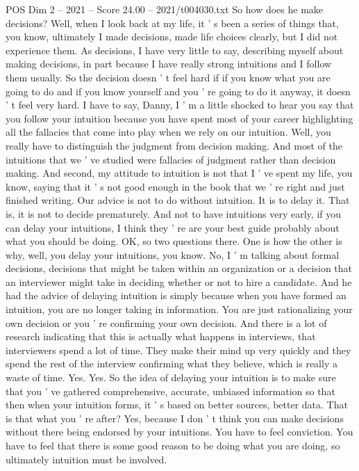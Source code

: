 \begin{textsample}{POS Dim 2 – 2021 – Score 24.00 – 2021/t004030.txt}
So how does he make decisions?
Well, when I look back at my life, it ' s been a series of things that, you know, ultimately I made decisions, made life choices clearly, but I did not experience them.
As decisions, I have very little to say, describing myself about making decisions, in part because I have really strong intuitions and I follow them usually.
So the decision doesn ' t feel hard if if you know what you are going to do and if you know yourself and you ' re going to do it anyway, it doesn ' t feel very hard.
I have to say, Danny, I ' m a little shocked to hear you say that you follow your intuition because you have spent most of your career highlighting all the fallacies that come into play when we rely on our intuition.
Well, you really have to distinguish the judgment from decision making.
And most of the intuitions that we ' ve studied were fallacies of judgment rather than decision making.
And second, my attitude to intuition is not that I ' ve spent my life, you know, saying that it ' s not good enough in the book that we ' re right and just finished writing.
Our advice is not to do without intuition.
It is to delay it.
That is, it is not to decide prematurely.
And not to have intuitions very early, if you can delay your intuitions, I think they ' re are your best guide probably about what you should be doing.
OK, so two questions there.
One is how the other is why, well, you delay your intuitions, you know.
No, I ' m talking about formal decisions, decisions that might be taken within an organization or a decision that an interviewer might take in deciding whether or not to hire a candidate.
And he had the advice of delaying intuition is simply because when you have formed an intuition, you are no longer taking in information.
You are just rationalizing your own decision or you ' re confirming your own decision.
And there is a lot of research indicating that this is actually what happens in interviews, that interviewers spend a lot of time.
They make their mind up very quickly and they spend the rest of the interview confirming what they believe, which is really a waste of time.
Yes.
Yes.
So the idea of delaying your intuition is to make sure that you ' ve gathered comprehensive, accurate, unbiased information so that then when your intuition forms, it ' s based on better sources, better data.
That is that what you ' re after?
Yes, because I don ' t think you can make decisions without there being endorsed by your intuitions.
You have to feel conviction.
You have to feel that there is some good reason to be doing what you are doing, so ultimately intuition must be involved.

\end{textsample}
